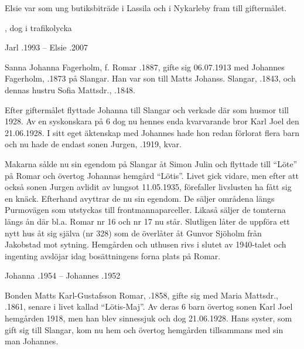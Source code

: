 Elsie var som ung butiksbiträde i Lassila och i Nykarleby fram till giftermålet.
\begin{jhchildren}
  \item {}
  \item {}, dog i trafikolycka
\end{jhchildren}

Jarl .1993  --  Elsie .2007




Sanna Johanna Fagerholm, f. Romar .1887, gifte sig 06.07.1913 med Johannes Fagerholm, .1873 på Slangar. Han var son till Matts Johanss. Slangar, .1843, och dennas hustru Sofia Mattsdr., .1848.

Efter giftermålet flyttade Johanna till Slangar och verkade där som husmor till 1928. Av en syskonskara på 6 dog nu hennes enda kvarvarande bror Karl Joel den 21.06.1928. I sitt eget äktenskap med Johannes hade hon redan förlorat flera barn och nu hade de endast sonen Jurgen, .1919, kvar.

Makarna sålde nu sin egendom på Slangar åt Simon Julin och flyttade till ``Löte'' på Romar och övertog Johannas hemgård  ``Lötis''. Livet gick vidare, men efter att också sonen Jurgen avlidit av lungsot 11.05.1935, förefaller livslusten ha fått sig en knäck. Efterhand avyttrar de nu sin egendom. De säljer områdena  längs Purmovägen som utstyckas till frontmannaparceller. Likaså säljer de tomterna längs ån där bl.a.  Romar nr 16 och nr 17 nu står. Slutligen låter de uppföra ett nytt hus åt sig själva  (nr 328) som de överlåter åt Gunvor Sjöholm från Jakobstad mot sytning. Hemgården och uthusen rivs i slutet av 1940-talet och ingenting avslöjar idag bosättningens forna plats på Romar.

Johanna .1954  --  Johannes .1952



Bonden Matts Karl-Gustafsson Romar, .1858, gifte sig med Maria Mattsdr., .1861, senare i livet kallad ``Lötis-Maj''. Av deras 6 barn övertog sonen Karl Joel hemgården 1918, men han blev sinnessjuk och dog 21.06.1928. Hans syster, som gift sig till Slangar, kom nu hem och övertog hemgården tillsammans med sin man Johannes.

